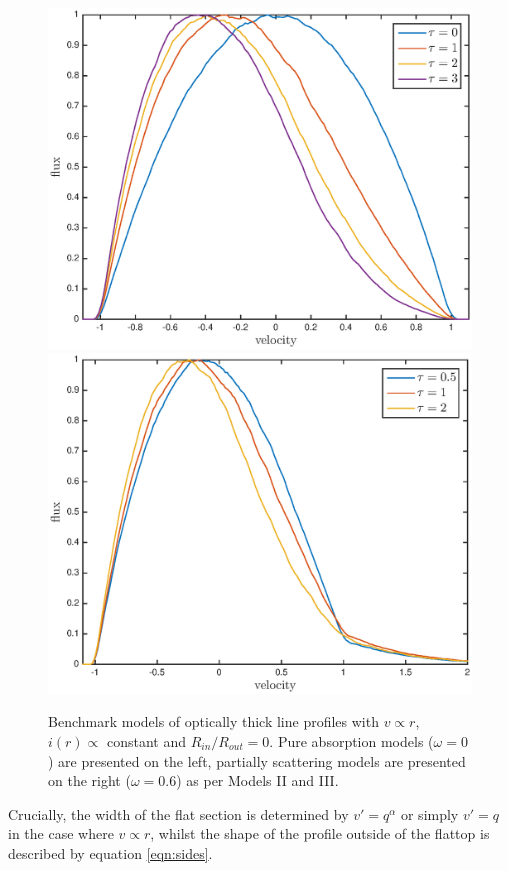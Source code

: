 \documentclass[useAMS,usenatbib,usegraphicx]{mnras}
\begin{document}
\begin{figure}
\includegraphics[trim =37 10 45 15,clip=true,scale=0.51]{params/opt_thick_w0} 
\includegraphics[trim =37 10 45 15,clip=true,scale=0.51]{params/opt_thick_w0_6}  
\caption{Benchmark models of optically thick line profiles  with $v \propto r$, $i(r) \propto$ constant and $R_{in}/R_{out}=0$.  Pure absorption models ($\omega = 0$) are presented on the left, partially scattering models are presented on the right ($\omega = 0.6$) as per \citet{Lucy1989a} Models II and III.}
\label{fig:Lucy}
\end{figure}
Crucially, the width of the flat section is determined by $v'=q^\alpha$ or simply $v'=q$ in the case where $v \propto r$, whilst the shape of the profile outside of the flattop is described by equation \ref{eqn:sides}.
\end{document}
